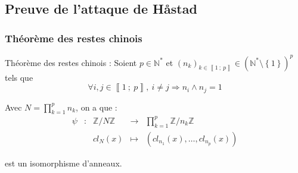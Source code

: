 \documentclass{beamer}
\newcommand{\N}{\mathbb{N}} %
\newcommand{\Z}{\mathbb{Z}} %
\newcommand{\nset}[2]{\left\llbracket #1\ ;\ #2 \right\rrbracket}
\newcommand{\lr}[1]{\left( #1 \right)}
\newcommand{\set}[1]{\left\{ #1 \right\}}
\begin{document}
    \subsection{Preuve de l'attaque de Håstad}
    \begin{frame}
        \frametitle{Théorème des restes chinois}

        \begin{block}{Théorème des restes chinois :}
            Soient $p \in \N^*$ et $\lr{n_k}_{k \in \nset 1 p} \in \lr{\N^* \setminus \set 1}^p$ tels que
            \[
                \forall i, j \in \nset 1 p,\ i \neq j \Rightarrow n_i \wedge n_j = 1
            \]

            Avec $\displaystyle N = \prod_{k = 1}^p n_k$, on a que :
            \[
                \begin{array}{ccccc}
                    \psi & : & \Z / N\Z & \longrightarrow & \displaystyle \prod_{k = 1}^p \Z / n_k\Z
                    \\
                    && cl_N(x) & \longmapsto & \lr{cl_{n_1}(x), \ldots, cl_{n_p}(x)}
                \end{array}
            \]

            est un isomorphisme d'anneaux.
        \end{block}

    \end{frame}
\end{document}
